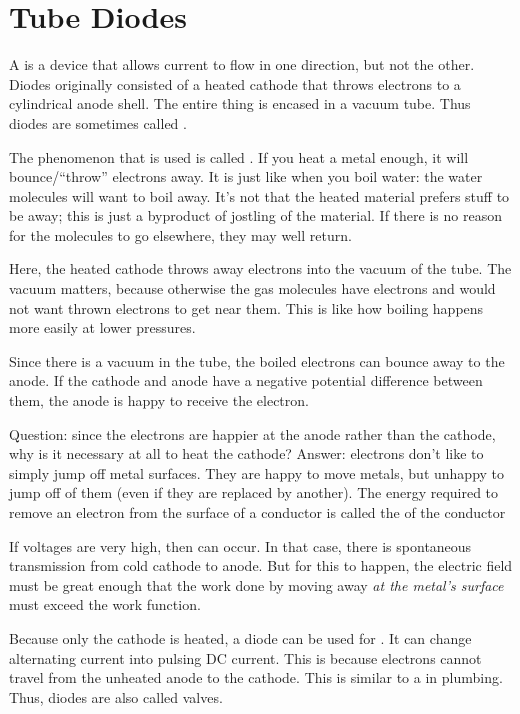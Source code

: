 \documentclass[11pt, oneside]{amsart}
\begin{document}
\section{Tube Diodes}

A  is a device that allows current to flow in one
direction, but not the other. Diodes originally consisted of a heated
cathode that throws electrons to a cylindrical anode shell. The entire
thing is encased in a vacuum tube. Thus diodes are sometimes called
.

The phenomenon that is used is called . If
you heat a metal enough, it will bounce/``throw'' electrons away. It is
just like when you boil water: the water molecules will want to boil
away. It's not that the heated material prefers stuff to be away; this
is just a byproduct of jostling of the material. If there is no reason
for the molecules to go elsewhere, they may well return.

Here, the heated cathode throws away electrons into the vacuum of the
tube. The vacuum matters, because otherwise the gas molecules have
electrons and would not want thrown electrons to get near them. This is
like how boiling happens more easily at lower pressures.

Since there is a vacuum in the tube, the boiled electrons can bounce
away to the anode. If the cathode and anode have a negative potential
difference between them, the anode is happy to receive the electron.

Question: since the electrons are happier at the anode rather than the
cathode, why is it necessary at all to heat the cathode? Answer:
electrons don't like to simply jump off metal surfaces. They are happy
to move  metals, but unhappy to jump off of them (even
if they are replaced by another). The energy required to remove an
electron from the surface of a conductor is called the  of the conductor

If voltages are very high, then  can
occur. In that case, there is spontaneous transmission from cold cathode
to anode. But for this to happen, the electric field must be great
enough that the work done by moving away \emph{at the metal's surface}
must exceed the work function.

Because only the cathode is heated, a diode can be used for
. It can change alternating current into pulsing
DC current. This is because electrons cannot travel from the unheated
anode to the cathode. This is similar to a  in plumbing.
Thus, diodes are also called valves.
\end{document}
